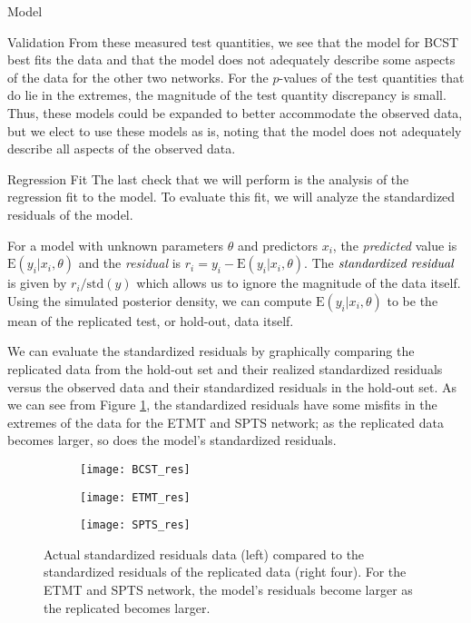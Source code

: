 \begin{chapter}{Model}
\begin{section}{Validation}
    From these measured test quantities, we see that the model for BCST best fits the data and that
    the model does not adequately describe some aspects of the data for the other two networks.
    For the $p$-values of the test quantities that do lie in the extremes, the magnitude
    of the test quantity discrepancy is small. Thus, these models could be expanded to better accommodate
    the observed data, but we elect to use these models as is, noting that the
    model does not adequately describe all aspects of the observed data.

  \begin{subsection}{Regression Fit}
    The last check that we will perform is the analysis of the regression fit to the
    model. To evaluate this fit, we will analyze the standardized residuals of the model.

    For a model with unknown parameters $\theta$ and predictors $x_i$, the \emph{predicted}
    value is $\text{E}(y_i | x_i, \theta)$ and the \emph{residual} is $r_i = y_i - \text{E}(y_i | x_i, \theta)$.
    The $\emph{standardized residual}$ is given by $r_i / \text{std}(y)$ which allows us to
    ignore the magnitude of the data itself. Using the simulated posterior density,
    we can compute $\text{E}(y_i | x_i, \theta)$
    to be the mean of the replicated test, or hold-out, data itself.

    We can evaluate the standardized residuals by graphically comparing the replicated data from the hold-out set
    and their realized standardized residuals versus the observed data and their standardized residuals in the hold-out set.
    As we can see from Figure \ref{fig:res}, the standardized residuals have some misfits in the extremes of the data
    for the ETMT and SPTS network; as the replicated data becomes larger, so does the model's standardized residuals.

    \begin{figure}[!h]
      \begin{subfigure}[b]{.75\textwidth}
        \centering
        \texttt{[image: BCST\_res]}
      \end{subfigure}
      \begin{subfigure}[b]{.75\textwidth}
        \centering
        \texttt{[image: ETMT\_res]}
      \end{subfigure}
      \begin{subfigure}[b]{.75\textwidth}
        \centering
        \texttt{[image: SPTS\_res]}
      \end{subfigure}
      \caption{Actual standardized residuals data (left) compared to the standardized residuals of the replicated data (right four). For the ETMT and SPTS
        network, the model's residuals become larger as the replicated becomes larger.}
      \label{fig:res}
    \end{figure}


\end{subsection}
\end{section}
\end{chapter}
